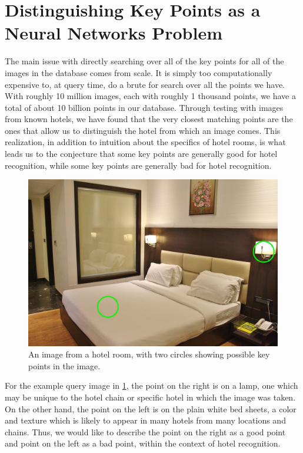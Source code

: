 \documentclass{scrartcl}
\begin{document}
\section{Distinguishing Key Points as a Neural Networks Problem}
The main issue with directly searching over all of the key points for all of the images in the database comes from scale. It is simply too computationally expensive to, at query time, do a brute for search over all the points we have. With roughly 10 million images, each with roughly 1 thousand points, we have a total of about 10 billion points in our database. Through testing with images from known hotels, we have found that the very closest matching points are the ones that allow us to distinguish the hotel from which an image comes. This realization, in addition to intuition about the specifics of hotel rooms, is what leads us to the conjecture that some key points are generally good for hotel recognition, while some key points are generally bad for hotel recognition.

\begin{figure}
\begin{center}
\includegraphics[scale=.3]{goodbadpoint_hotel}
\end{center}
\caption{An image from a hotel room, with two circles showing possible key points in the image.}
\label{img}
\end{figure}

For the example query image in \ref{img}, the point on the right is on a lamp, one which may be unique to the hotel chain or specific hotel in which the image was taken. On the other hand, the point on the left is on the plain white bed sheets, a color and texture which is likely to appear in many hotels from many locations and chains. Thus, we would like to describe the point on the right as a good point and point on the left as a bad point, within the context of hotel recognition. 
\end{document}
